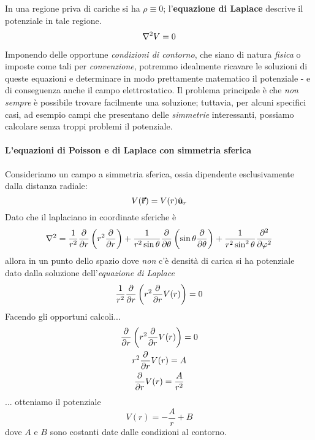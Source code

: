 In una regione priva di cariche si ha $\rho\equiv0$; l'\textbf{equazione di Laplace} descrive il potenziale in tale regione.
\begin{equation}
	\laplacian{V}=0
\end{equation}

Imponendo delle opportune \textit{condizioni di contorno}, che siano di natura \textit{fisica} o imposte come tali per \textit{convenzione}, potremmo idealmente ricavare le soluzioni di queste equazioni e determinare in modo prettamente matematico il potenziale - e di conseguenza anche il campo elettrostatico. Il problema principale è che \textit{non sempre} è possibile trovare facilmente una soluzione; tuttavia, per alcuni specifici casi, ad esempio campi che presentano delle \textit{simmetrie} interessanti, possiamo calcolare senza troppi problemi il potenziale.
\paragraph{L'equazioni di Poisson e di Laplace con simmetria sferica}\label{EquazioniPoissonSimmetriaSferica}
Consideriamo un campo a simmetria sferica, ossia dipendente esclusivamente dalla distanza radiale:
\begin{equation*}
	V(\vb*{\va{r}})=V(r)\hat{\mathbf{u}}_r
\end{equation*}
Dato che il laplaciano in coordinate sferiche è
	\begin{equation*}
		\laplacian=\frac{1}{r^2}\pdv{r}\left(r^2\pdv{r}\right)+\frac{1}{r^2\sin\theta}\pdv{\theta}\left(\sin\theta\pdv{\theta}\right)+\frac{1}{r^2\sin^2\theta}\pdv[2]{\phi}
	\end{equation*}
allora in un punto dello spazio dove \textit{non} c'è densità di carica si ha potenziale dato dalla soluzione dell'\textit{equazione di Laplace}
\begin{equation*}
	\frac{1}{r^2}\pdv{r}\left(r^2\pdv{r}V(r)\right)=0
\end{equation*}
Facendo gli opportuni calcoli...
\begin{gather*}
	\pdv{r}\left(r^2\pdv{r}V(r)\right)=0\\
	r^2\pdv{r}V(r)=A\\
	\pdv{r}V(r)=\frac{A}{r^2}\\
\end{gather*}
... otteniamo il potenziale
\begin{equation}
	V(r)=-\frac{A}{r}+B
\end{equation}
dove $A$ e $B$ sono costanti date dalle condizioni al contorno.

